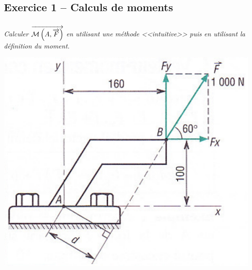 \documentclass[10pt]{article}
\newif\ifxp
\begin{document}
\ifxp

\else

\fi


\subsection*{Exercice 1 -- Calculs de moments}

\begin{minipage}[c]{.68\linewidth}
\subparagraph*{}
\textit{Calculer $\overrightarrow{\mathcal{M}\left(A,\overrightarrow{F}\right)}$ en utilisant une méthode <<intuitive>> puis en utilisant la définition du moment.}
\end{minipage}\hfill
\begin{minipage}[c]{.3\linewidth}
\begin{center}
\includegraphics[width=\textwidth]{images/moment1}
\end{center}
\end{minipage}
\end{document}
